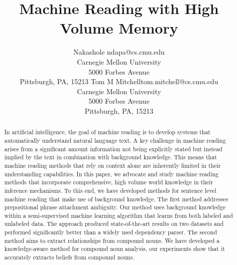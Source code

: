 \documentclass[jair,twoside,11pt,theapa]{article}
\begin{document}
\title{Machine Reading   with  High Volume  Memory}

\author{\name  Nakashole \email ndapa@cs.cmu.edu \\
       \addr Carnegie Mellon University\\
       5000 Forbes Avenue \\
		Pittsburgh, PA, 15213
       \AND
       \name Tom M Mitchell\email tom.mitchell@cs.cmu.edu \\
       \addr Carnegie Mellon University\\
       5000 Forbes Avenue \\
		Pittsburgh, PA, 15213
       }
       


\maketitle


\begin{abstract}
In artificial intelligence, the goal of machine reading is to develop systems that automatically understand natural language text.   
A key challenge in machine reading  arises from a significant amount information not being explicitly stated  but instead  implied by the text in combination with  background knowledge. This means that machine reading methods that rely on  context alone are inherently limited in their understanding capabilities. In this paper, we advocate and  study machine reading methods that incorporate  comprehensive, high volume world knowledge in their inference mechanisms.
To this end, we  have developed methods for sentence level machine reading  that make use of  background knowledge.  
The first method addresses prepositional phrase attachment ambiguity. Our  method  uses  background knowledge within a semi-supervised machine learning algorithm that learns from both labeled and unlabeled data. The approach produced state-of-the-art results on two datasets and  performed significantly better than  a widely used dependency parser. The second method aims to extract relationships from compound nouns.  We have developed a  knowledge-aware method for compound noun analysis, our experiments show that it accurately extracts beliefs from compound nouns.

\end{abstract}
\end{document}
